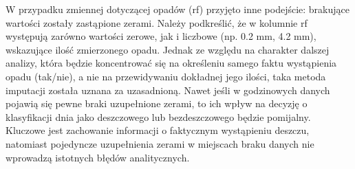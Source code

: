\documentclass[10pt,a4paper]{article}
\begin{document}
\par
\hspace{0.75cm}
W przypadku zmiennej dotyczącej opadów (rf) przyjęto inne podejście: brakujące wartości zostały zastąpione zerami. Należy podkreślić, że w kolumnie rf występują zarówno wartości zerowe, jak i liczbowe (np. 0.2 mm, 4.2 mm), wskazujące ilość zmierzonego opadu. Jednak ze względu na charakter dalszej analizy, która będzie koncentrować się na określeniu samego faktu wystąpienia opadu (tak/nie), a nie na przewidywaniu dokładnej jego ilości, taka metoda imputacji została uznana za uzasadnioną. Nawet jeśli w godzinowych danych pojawią się pewne braki uzupełnione zerami, to ich wpływ na decyzję o klasyfikacji dnia jako deszczowego lub bezdeszczowego będzie pomijalny. Kluczowe jest zachowanie informacji o faktycznym wystąpieniu deszczu, natomiast pojedyncze uzupełnienia zerami w miejscach braku danych nie wprowadzą istotnych błędów analitycznych.
\end{document}
